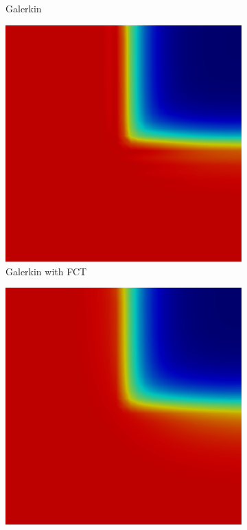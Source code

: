 \begin{figure}[ht]
\begin{subfigure}{0.3\textwidth}
      \caption{Galerkin}
   \end{subfigure}
   \begin{subfigure}{0.3\textwidth}
      \includegraphics[width=\textwidth]{skew_void_to_absorber/GalFCT.png}
      \caption{Galerkin with FCT}
   \end{subfigure}
   \begin{subfigure}{0.3\textwidth}
      \includegraphics[width=\textwidth]{skew_void_to_absorber/low.png}

\end{subfigure}
\end{figure}
